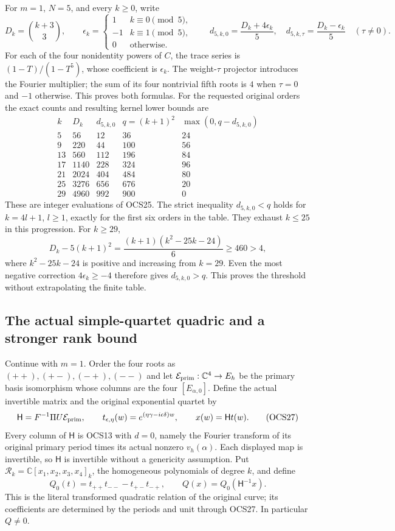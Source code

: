 \documentclass[11pt,a4paper]{article}
\begin{document}
For $m=1$, $N=5$, and every $k\geq0$, write
\[
 D_k=\binom{k+3}{3},\qquad
 \epsilon_k=\begin{cases}1&k\equiv0\pmod5,\\-1&k\equiv1\pmod5,\\
                         0&\text{otherwise}.
             \end{cases}
 \qquad
 d_{5,k,0}=\frac{D_k+4\epsilon_k}{5},\quad
 d_{5,k,\tau}=\frac{D_k-\epsilon_k}{5}\quad(\tau\ne0).
 \tag{OCS25}
\]
For each of the four nonidentity powers of $C$, the trace
series is $(1-T)/(1-T^5)$, whose coefficient is $\epsilon_k$.
The weight-$\tau$ projector introduces the Fourier multiplier;
the sum of its four nontrivial fifth roots is $4$ when
$\tau=0$ and $-1$ otherwise. This proves both formulas.
For the requested original orders the exact counts and resulting
kernel lower bounds are
\[
\begin{array}{c|r|r|r|r}
 k&D_k&d_{5,k,0}&q=(k+1)^2&\max(0,q-d_{5,k,0})\\\hline
 5&56&12&36&24\\
 9&220&44&100&56\\
 13&560&112&196&84\\
 17&1140&228&324&96\\
 21&2024&404&484&80\\
 25&3276&656&676&20\\
 29&4960&992&900&0
\end{array}\tag{OCS26}
\]
These are integer evaluations of OCS25. The strict inequality
$d_{5,k,0}<q$ holds for $k=4l+1$, $l\geq1$, exactly for the
first six orders in the table. They exhaust $k\leq25$ in this
progression. For $k\geq29$,
\[
 D_k-5(k+1)^2=\frac{(k+1)(k^2-25k-24)}6\geq460>4,
\]
where $k^2-25k-24$ is positive and increasing from $k=29$.
Even the most negative correction $4\epsilon_k\geq-4$
therefore gives $d_{5,k,0}>q$. This proves the threshold
without extrapolating the finite table.

\subsection{The actual simple-quartet quadric and a stronger rank bound}
Continue with $m=1$. Order the four roots as
$(++),(+-),(-+),(--)$ and let
$\mathcal E_{\rm prim}:\mathbb C^4\to E_h$ be the primary
basis isomorphism whose columns are the four $[E_{\alpha,0}]$.
Define the actual invertible matrix and the original exponential
quartet by
\[
 \mathsf H=F^{-1}\Pi U\mathcal E_{\rm prim},\qquad
 t_{\epsilon,\eta}(w)=e^{(\eta\gamma-i\epsilon\delta)w},
 \qquad x(w)=\mathsf Ht(w).
 \tag{OCS27}
\]
Every column of $\mathsf H$ is OCS13 with $d=0$, namely the
Fourier transform of its original primary period times its
actual nonzero $v_h(\alpha)$. Each displayed map is invertible,
so $\mathsf H$ is invertible without a genericity assumption.
Put $\mathcal R_k=\mathbb C[x_1,x_2,x_3,x_4]_k$, the homogeneous
polynomials of degree $k$, and define
\[
 Q_0(t)=t_{++}t_{--}-t_{+-}t_{-+},\qquad
 Q(x)=Q_0(\mathsf H^{-1}x).
 \tag{OCS28}
\]
This is the literal transformed quadratic relation of the
original curve; its coefficients are determined by the periods
and unit through OCS27. In particular $Q\ne0$.
\end{document}
